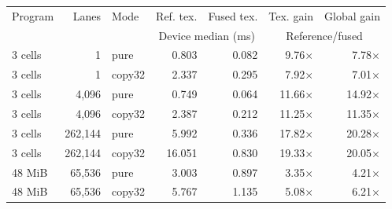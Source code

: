 \begin{center}\small
\begin{tabular}{@{}l r l r r r r@{}}
\toprule
Program & Lanes & Mode & Ref. tex. & Fused tex. & Tex. gain & Global gain\\
 & & & \multicolumn{2}{c}{Device median (ms)} & \multicolumn{2}{c}{Reference/fused}\\\midrule
3 cells & 1 & pure & 0.803 & 0.082 & 9.76$\times$ & 7.78$\times$\\
3 cells & 1 & copy32 & 2.337 & 0.295 & 7.92$\times$ & 7.01$\times$\\
3 cells & 4,096 & pure & 0.749 & 0.064 & 11.66$\times$ & 14.92$\times$\\
3 cells & 4,096 & copy32 & 2.387 & 0.212 & 11.25$\times$ & 11.35$\times$\\
3 cells & 262,144 & pure & 5.992 & 0.336 & 17.82$\times$ & 20.28$\times$\\
3 cells & 262,144 & copy32 & 16.051 & 0.830 & 19.33$\times$ & 20.05$\times$\\
48 MiB & 65,536 & pure & 3.003 & 0.897 & 3.35$\times$ & 4.21$\times$\\
48 MiB & 65,536 & copy32 & 5.767 & 1.135 & 5.08$\times$ & 6.21$\times$\\
\bottomrule
\end{tabular}\end{center}
